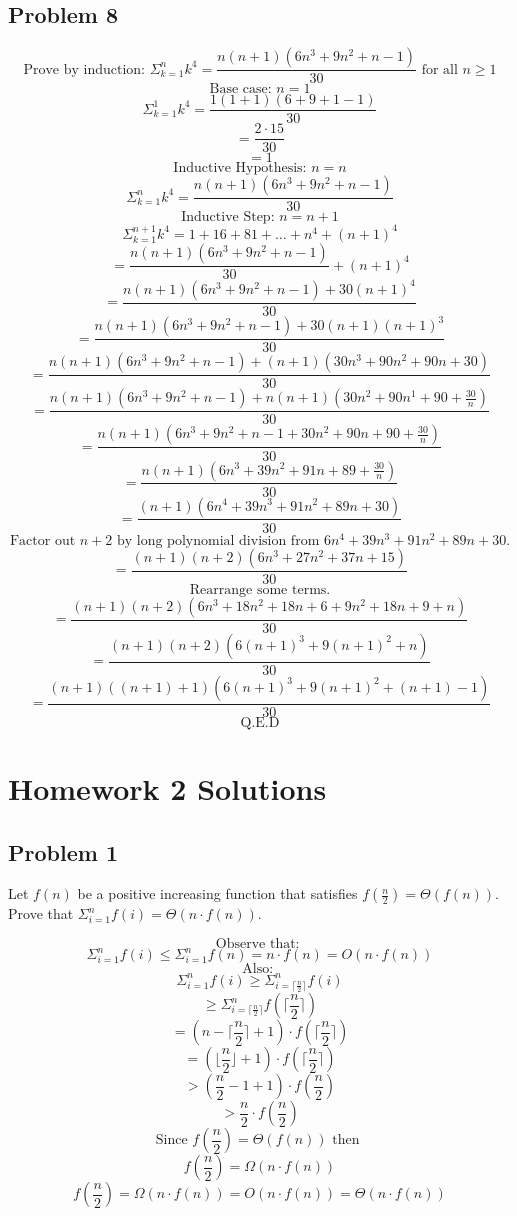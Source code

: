 \documentclass{article}
\begin{document}
\subsection{Problem 8}

$$\text{Prove by induction: } \Sigma_{k=1}^{n} k^4 = \frac{n(n+1)(6n^3 + 9n^2 + n - 1)}{30} \text{ for all } n \ge 1$$
$$\text{Base case: } n = 1 $$
$$\Sigma_{k=1}^{1} k^4 = \frac{1(1+1)(6+9+1-1)}{30}$$
$$= \frac{2\cdot15}{30}$$
$$= 1 $$
$$\text{Inductive Hypothesis: } n = n$$
$$\Sigma_{k=1}^{n} k^4 = \frac{n(n+1)(6n^3 + 9n^2 + n - 1)}{30}$$
$$\text{Inductive Step: } n = n+1$$
$$\Sigma_{k=1}^{n+1} k^4 = 1 + 16 + 81 + \dots + n^4 + (n+1)^4$$
$$= \frac{n(n+1)(6n^3 + 9n^2 + n - 1)}{30} + (n+1)^4$$
$$= \frac{n(n+1)(6n^3 + 9n^2 + n - 1) + 30(n+1)^4}{30} $$
$$= \frac{n(n+1)(6n^3 + 9n^2 + n - 1) + 30(n+1)(n+1)^3}{30} $$
$$= \frac{n(n+1)(6n^3 + 9n^2 + n - 1) + (n+1)(30n^3 + 90n^2 + 90n +30)}{30} $$
$$= \frac{n(n+1)(6n^3 + 9n^2 + n - 1) + n(n+1)(30n^2 + 90n^1 + 90 + \frac{30}{n})}{30} $$
$$= \frac{n(n+1)(6n^3 + 9n^2 + n - 1 + 30n^2 + 90n + 90 + \frac{30}{n})}{30} $$
$$= \frac{n(n+1)(6n^3 + 39n^2 + 91n + 89 + \frac{30}{n})}{30} $$
$$= \frac{(n+1)(6n^4 + 39n^3 + 91n^2 + 89n + 30)}{30} $$
$$\text{Factor out } n + 2 \text{ by long polynomial division from } 6n^4 + 39n^3 + 91n^2 + 89n + 30 \text{.}$$
$$= \frac{(n+1)(n+2)(6n^3 + 27n^2 + 37n + 15)}{30} $$
$$\text{Rearrange some terms.}$$
$$= \frac{(n+1)(n+2)(6n^3 + 18n^2 + 18n + 6 + 9n^2 + 18n + 9 + n)}{30} $$
$$= \frac{(n+1)(n+2)(6(n+1)^3 + 9(n+1)^2 + n)}{30} $$
$$= \frac{(n+1)((n + 1) + 1)(6(n+1)^3 + 9(n+1)^2 + (n + 1) - 1)}{30} $$
$$\text{Q.E.D}$$

\section{Homework 2 Solutions}

\subsection{Problem 1}
Let $f(n)$ be a positive increasing function that satisfies $f(\frac{n}{2}) = \Theta(f(n))$. Prove that $\Sigma_{i = 1}^{n} f(i) = \Theta(n \cdot f(n))$.

$$\text{Observe that: }$$
$$\Sigma_{i = 1}^{n} f(i) \le \Sigma_{i = 1}^{n} f(n) = n \cdot f(n) = O(n \cdot f(n))  $$
$$\text{Also: }$$
$$\Sigma_{i = 1}^{n} f(i) \ge \Sigma_{i = \lceil \frac{n}{2} \rceil}^{n} f(i) $$
$$\ge \Sigma_{i = \lceil \frac{n}{2} \rceil}^{n} f(\lceil \frac{n}{2} \rceil)  $$
$$ = (n - \lceil \frac{n}{2} \rceil + 1) \cdot f(\lceil \frac{n}{2} \rceil)$$
$$ = (\lfloor \frac{n}{2} \rfloor + 1) \cdot f(\lceil \frac{n}{2} \rceil)$$
$$> (\frac{n}{2} - 1 + 1) \cdot f(\frac{n}{2})$$
$$> \frac{n}{2} \cdot f(\frac{n}{2})$$
$$\text{Since } f(\frac{n}{2}) = \Theta(f(n)) \text{ then }$$
$$f(\frac{n}{2}) = \Omega(n \cdot f(n))$$
$$f(\frac{n}{2}) = \Omega(n \cdot f(n)) = O(n \cdot f(n)) = \Theta(n \cdot f(n))$$
\end{document}
